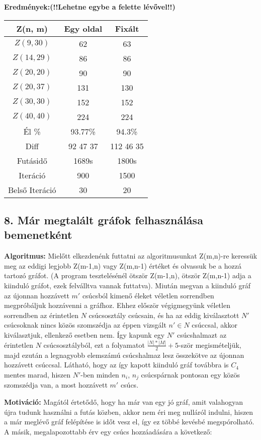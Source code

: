 \documentclass[12pt,a4paper]{article}
\begin{document}
\textbf{Eredmények:(!!Lehetne egybe a felette lévővel!!)}
\begin{table}[H]
\centering
\begin{tabular}{|c|c|c|}
\hline
\textbf{Z(n, m)} & \textbf{Egy oldal} & \textbf{Fixált} \\
\hline
$Z(9,30)$  & 62 & 63 \\
$Z(14, 29)$ & 86 & 86 \\
$Z(20, 20)$ & 90 & 90 \\
$Z(20, 37)$ & 131 & 130 \\
$Z(30, 30)$ & 152 & 152 \\
$Z(40, 40)$ & 224 & 224 \\
\hline
Él \% & 93.77\% & 94.3\% \\
\hline
Diff & 92 47 37 & 112 46 35 \\
\hline
Futásidő & 1689s & 1800s \\
Iteráció & 900 & 1500 \\
Belső Iteráció & 30 & 20 \\
\hline
\end{tabular}
\end{table}

\subsection*{8. Már megtalált gráfok felhasználása bemenetként}
\textbf{Algoritmus:} Mielőtt elkezdenénk futtatni az algoritmusunkat Z(m,n)-re keressük meg az eddigi legjobb Z(m-1,n) vagy Z(m,n-1) értéket és olvassuk be a hozzá tartozó gráfot. (A program tesztelésénél ötször Z(m-1,n), ötször Z(m,n-1) adja a kiinduló gráfot, ezek felválltva vannak futtatva). Miután megvan a kiinduló gráf az újonnan hozzávett $m'$ csúcsból kimenő éleket véletlen sorrendben megpróbáljuk hozzávenni a gráfhoz. Ehhez először végigmegyünk véletlen sorrendben az érintetlen $N$ csúcsosztály csúcsain, és ha az eddig kiválasztott $N'$ csúcsoknak nincs közös szomszédja az éppen vizsgált $n' \in N$ csúccsal, akkor kiválasztjuk, ellenkező esetben nem.  Így kapunk egy $N'$ csúcshalmazt az érintetlen $N$ csúcsosztályból, ezt a folyamatot $\tfrac{|N|*|M|}{2}+5$-ször megismételjük, majd ezután a legnagyobb elemszámú csúcshalmaz lesz összekötve az újonnan hozzávett csúccsal. Látható, hogy az így kapott kiinduló gráf továbbra is $C_4$ mentes marad, hiszen $N'$-ben minden $n_i$, $n_j$ csúcspárnak pontosan egy közös szomszédja van, a most hozzávett $m'$ csúcs.

\textbf{Motiváció:} Magától értetődő, hogy ha már van egy jó gráf, amit valahogyan újra tudunk használni a futás közben, akkor nem éri meg nulláról indulni, hiszen a már meglévő gráf felépítése is időt vesz el, így ez többé kevésbé megspórolható. A másik, megalapozottabb érv egy csúcs hozzáadására a következő:
\end{document}
